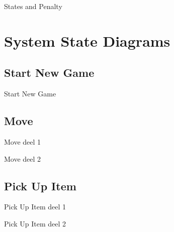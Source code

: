 \documentclass[t]{beamer}
\begin{document}
\begin{frame}{States and Penalty}
\begin{center}
\end{center}
\end{frame}


\section{System State Diagrams}
\subsection{Start New Game}
\begin{frame}{Start New Game}
\begin{center}
\end{center}
\end{frame}

\subsection{Move}
\begin{frame}{Move deel 1}
\begin{center}
\end{center}
\end{frame}

\begin{frame}{Move deel 2}
\begin{center}
\end{center}
\end{frame}

\subsection{Pick Up Item}
\begin{frame}{Pick Up Item deel 1}
\begin{center}
\end{center}
\end{frame}

\begin{frame}{Pick Up Item deel 2}
\begin{center}
\end{center}
\end{frame}
\end{document}
